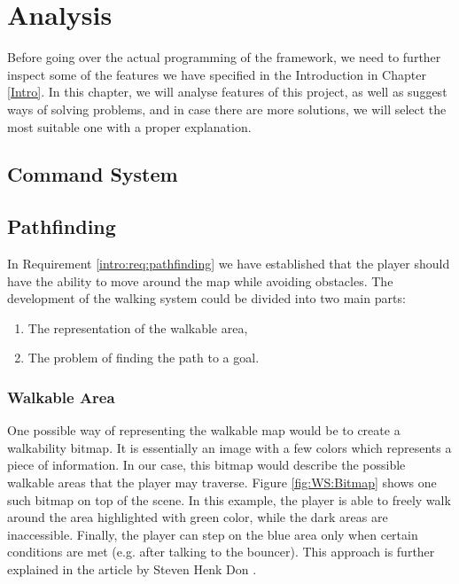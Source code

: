 \chapter{Analysis}

Before going over the actual programming of the framework, we need to further inspect some of the features we have specified in the Introduction in Chapter \ref{Intro}. In this chapter, we will analyse features of this project, as well as suggest ways of solving problems, and in case there are more solutions, we will select the most suitable one with a proper explanation.


\section{Command System}


\section{Pathfinding}
In Requirement \ref{intro:req:pathfinding}  we have established that the player should have the ability to move around the map while avoiding obstacles. 
The development of the walking system could be divided into two main parts:
\begin{enumerate}
    \item The representation of the walkable area,
    \item The problem of finding the path to a goal.
\end{enumerate} 

\subsection{Walkable Area}
\label{analysis:walkableMap}
One possible way of representing the walkable map would be to create a walkability bitmap. It is essentially an image with a few colors which represents a piece of information. In our case, this bitmap would describe the possible walkable areas that the player may traverse. Figure \ref{fig:WS:Bitmap} shows one such bitmap on top of the scene. In this example, the player is able to freely walk around the area highlighted with green color, while the dark areas are inaccessible. Finally, the player can step on the blue area only when certain conditions are met (e.g. after talking to the bouncer). This approach is further explained in the article by Steven Henk Don \cite{Shdon}.   

